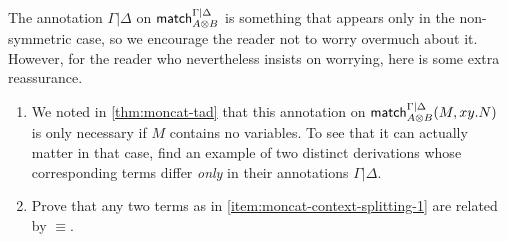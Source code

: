 \begin{ex}\label{ex:moncat-context-splitting}
  The annotation $\Gamma|\Delta$ on $\mathsf{match}_{A\otimes B}^{\Gamma|\Delta}$ is something that appears only in the non-symmetric case, so we encourage the reader not to worry overmuch about it.
  However, for the reader who nevertheless insists on worrying, here is some extra reassurance.
  \begin{enumerate}
  \item We noted in \cref{thm:moncat-tad} that this annotation on $\mathsf{match}_{A\otimes B}^{\Gamma|\Delta}(M,xy.N)$ is only necessary if $M$ contains no variables.
    To see that it can actually matter in that case, find an example of two distinct derivations whose corresponding terms differ \emph{only} in their annotations $\Gamma|\Delta$.\label{item:moncat-context-splitting-1}
  \item Prove that any two terms as in \ref{item:moncat-context-splitting-1} are related by $\equiv$.
  \end{enumerate}
\end{ex}

